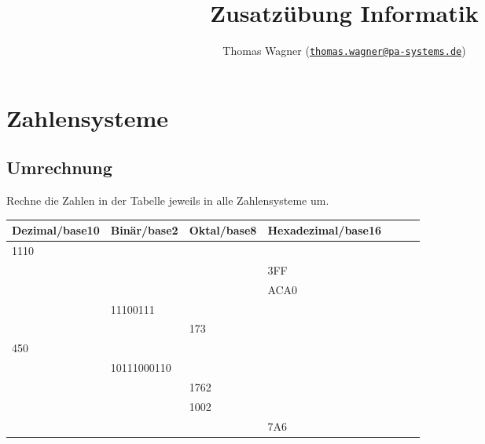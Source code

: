 \documentclass[]{scrartcl}
\title{Zusatzübung Informatik}
\author{Thomas Wagner (\href{mailto:thomas.wagner@pa-systems.de}{\texttt{thomas.wagner@pa-systems.de}})}
\begin{document}
\lstset{style=CStyle}

\maketitle

\section{Zahlensysteme}

\subsection{Umrechnung}
Rechne die Zahlen in der Tabelle jeweils in alle Zahlensysteme um.

\begin{table}[h!]
	\centering
	\begin{tabular}{l|l|l|llll}
		\multicolumn{1}{c|}{\textbf{Dezimal/base10}} &
		\multicolumn{1}{c|}{\textbf{Binär/base2}} &
		\multicolumn{1}{c|}{\textbf{Oktal/base8}} &
		\multicolumn{1}{c}{\textbf{Hexadezimal/base16}} &
		\multicolumn{1}{c}{\textbf{}} &
		\multicolumn{1}{c}{\textbf{}} &
		\multicolumn{1}{c}{\textbf{}} \\ \hline
		1110 &             &      &      &  &  &  \\ \hline
		     &             &      & 3FF  &  &  &  \\ \hline
		  	 &             &      & ACA0 &  &  &  \\ \hline
		     & 11100111    &      &      &  &  &  \\ \hline
		     &             & 173  &      &  &  &  \\ \hline
		450  &             &      &      &  &  &  \\ \hline
		     & 10111000110 &      &      &  &  &  \\ \hline
		     &             & 1762 &      &  &  &  \\ \hline
		     &             & 1002 &      &  &  &  \\ \hline
		     &             &      & 7A6  &  &  &
	\end{tabular}
\end{table}
\end{document}
